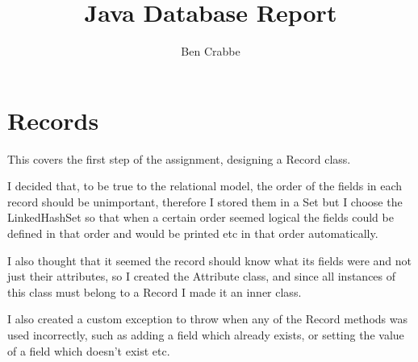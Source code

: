 \documentclass[11pt]{article} %
\author{Ben Crabbe}
\affil{University of Bristol, UK}
\title{%
Java Database Report}
\begin{document}
\maketitle
\section{Records}
This covers the first step of the assignment, designing a Record class.

I decided that, to be true to the relational model, the order of the fields in each record should be unimportant, therefore I stored them in a Set but I choose the LinkedHashSet so that when a certain order seemed logical the fields could be defined in that order and would be printed etc in that order automatically.

I also thought that it seemed the record should know what its fields were and not just their attributes, so I created the Attribute class, and since all instances of this class must belong to a Record I made it an inner class. 

I also created a custom exception to throw when any of the Record methods was used incorrectly, such as adding a field which already exists, or setting the value of a field which doesn't exist etc. 
\end{document}
